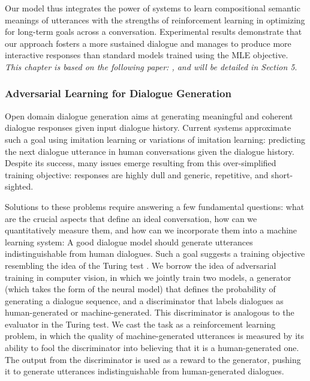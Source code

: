 Our model thus integrates the power of \sts systems to learn compositional semantic
meanings of utterances with the strengths of reinforcement learning in
optimizing for long-term goals across a conversation.
 Experimental results  demonstrate that our approach fosters a more sustained dialogue and
  manages to produce more interactive  responses than standard \sts models trained using the MLE objective.
  {\it This chapter is based on the following paper: , and will be detailed in Section 5}. 

  
  \subsubsection*{Adversarial Learning for Dialogue Generation}
  Open domain dialogue generation  aims at generating meaningful and
coherent dialogue responses given input dialogue
history. 
   Current  systems   
   approximate such a goal 
   using imitation learning or variations of imitation learning: 
    predicting the
next dialogue utterance in human conversations
given the dialogue history. 
 Despite its success, many
issues emerge resulting from this over-simplified
training objective: responses are highly dull and
generic,  repetitive, and short-sighted. 
   



Solutions to these problems require answering a few fundamental questions: 
what are the crucial aspects that define an ideal conversation, how can we quantitatively measure them, and how can we incorporate them into 
a machine learning system:
A good dialogue model should generate utterances indistinguishable from human dialogues.
Such a goal suggests a training objective 
resembling the idea of the Turing test \cite{turing1950computing}.
We borrow the idea of adversarial training \cite{goodfellow2014generative} in 
computer
vision, in which we jointly train two models, 
a generator (which takes the form of the neural  \sts model) that defines the probability of generating a dialogue sequence, and 
a discriminator
that labels dialogues as human-generated or machine-generated. 
This discriminator  is analogous to  the evaluator in the Turing test.
We cast the task as a reinforcement learning problem, in which the quality of machine-generated utterances is measured by its ability to fool the discriminator into believing that it is a human-generated one. The output from the discriminator is used as a reward to the generator, pushing it to generate 
utterances indistinguishable from human-generated dialogues. 

